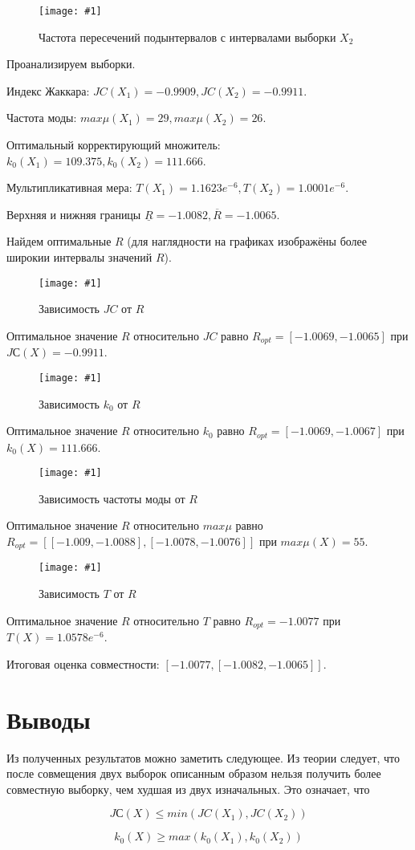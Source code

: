 \documentclass[a4paper,12pt]{article}
\newcommand{\plot}[3]{
  \begin{figure}[H]
    \begin{center}
      \texttt{[image: \#1]}
      \caption{#2}
      \label{#3}
    \end{center}
  \end{figure}
}
\begin{document}
\plot{./images/signal 2 mode hist.png}{Частота пересечений подынтервалов с интервалами выборки $ X_2 $}{p:modaX2}
\quad Проанализируем выборки.

Индекс Жаккара: $ JC(X_1) = -0.9909, JC(X_2) = -0.9911 $.

Частота моды: $ max\mu(X_1) = 29, max\mu(X_2) = 26 $.

Оптимальный корректирующий множитель: $ k_0(X_1) = 109.375, k_0(X_2) = 111.666 $.

Мультипликативная мера: $ T(X_1) = 1.1623e^{-6}, T(X_2) = 1.0001e^{-6} $.

Верхняя и нижняя границы $ \underline{R} = -1.0082, \overline{R} = -1.0065 $.

Найдем оптимальные $ R $
(для наглядности на графиках изображёны более широкии интервалы значений $ R $).
\plot{./images/sum signal JС.png}{Зависимость $ JC $ от $ R $}{p:jaccard}

Оптимальное значение $ R $ относительно $ JC $ равно $ R_{opt} = [-1.0069, -1.0065] $
при $ JС(X) = -0.9911 $.
\plot{./images/sum signal k.png}{Зависимость $ k_0 $ от $ R $}{p:k_0}

Оптимальное значение $ R $ относительно $ k_0 $ равно $ R_{opt} = [-1.0069, -1.0067] $
при $ k_0(X) = 111.666 $.
\plot{./images/sum signal maxmu.png}{Зависимость частоты моды от $ R $}{p:max_mu}

Оптимальное значение $ R $ относительно $ max\mu $ равно $ R_{opt} = [[-1.009, -1.0088], [-1.0078, -1.0076]] $
при $ max\mu(X) = 55 $.
\plot{./images/sum signal mult measure.png}{Зависимость $ T $ от $ R $}{p:t}

Оптимальное значение $ R $ относительно $ T $ равно $ R_{opt} = -1.0077 $
при $ T(X) = 1.0578e^{-6} $.

Итоговая оценка совместности: $ [-1.0077, [-1.0082, -1.0065]] $.

\section{Выводы}
\quad Из полученных результатов можно заметить следующее. Из теории следует, что после совмещения двух выборок описанным образом нельзя получить более совместную выборку, чем худшая из двух
изначальных. Это означает, что

\begin{equation}
  JС(X) \leq min(JC(X_1), JC(X_2))
\end{equation}

\begin{equation}
  k_0(X) \geq max(k_0(X_1), k_0(X_2))
\end{equation}
\end{document}
